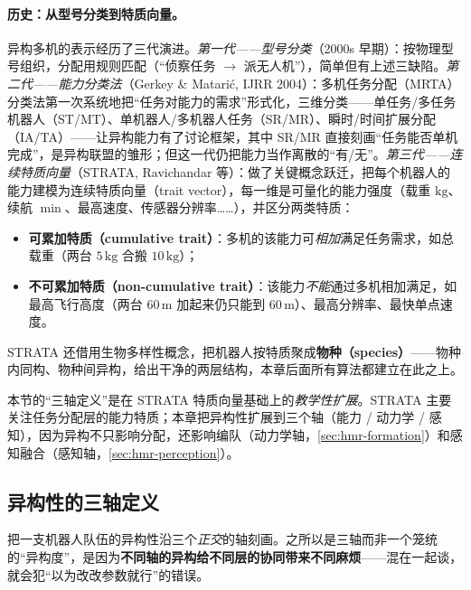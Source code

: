 \paragraph{历史：从型号分类到特质向量。}
异构多机的表示经历了三代演进。\emph{第一代——型号分类}（2000s 早期）：按物理型号组织，分配用规则匹配（“侦察任务 $\to$ 派无人机”），简单但有上述三缺陷。\emph{第二代——能力分类法}（Gerkey \& Matari\'c, IJRR 2004\cite{gerkey2004taxonomy}）：多机任务分配（MRTA）分类法第一次系统地把“任务对能力的需求”形式化，三维分类——单任务/多任务机器人（ST/MT）、单机器人/多机器人任务（SR/MR）、瞬时/时间扩展分配（IA/TA）——让异构能力有了讨论框架，其中 SR/MR 直接刻画“任务能否单机完成”，是异构联盟的雏形；但这一代仍把能力当作离散的“有/无”。\emph{第三代——连续特质向量}（STRATA, Ravichandar 等\cite{ravichandar2019strata}）：做了关键概念跃迁，把每个机器人的能力建模为连续特质向量（trait vector），每一维是可量化的能力强度（载重 $\mathrm{kg}$、续航 $\min$、最高速度、传感器分辨率……），并区分两类特质：
\begin{itemize}
  \item \textbf{可累加特质（cumulative trait）}：多机的该能力可\emph{相加}满足任务需求，如总载重（两台 $5\,\mathrm{kg}$ 合搬 $10\,\mathrm{kg}$）；
  \item \textbf{不可累加特质（non-cumulative trait）}：该能力\emph{不能}通过多机相加满足，如最高飞行高度（两台 $60\,\mathrm{m}$ 加起来仍只能到 $60\,\mathrm{m}$）、最高分辨率、最快单点速度。
\end{itemize}
STRATA 还借用生物多样性概念，把机器人按特质聚成\textbf{物种（species）}——物种内同构、物种间异构，给出干净的两层结构，本章后面所有算法都建立在此之上。

\begin{note}
本节的“三轴定义”是在 STRATA 特质向量基础上的\emph{教学性扩展}。STRATA 主要关注任务分配层的能力特质；本章把异构性扩展到三个轴（能力 / 动力学 / 感知），因为异构不只影响分配，还影响编队（动力学轴，\cref{sec:hmr-formation}）和感知融合（感知轴，\cref{sec:hmr-perception}）。
\end{note}

\subsection{异构性的三轴定义}
\label{sec:hmr-three-axes}
把一支机器人队伍的异构性沿三个\emph{正交}的轴刻画。之所以是三轴而非一个笼统的“异构度”，是因为\textbf{不同轴的异构给不同层的协同带来不同麻烦}——混在一起谈，就会犯“以为改改参数就行”的错误。

